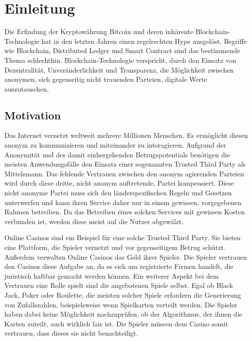 \chapter{Einleitung} %
\label{Chapter1}
\newcommand{\keyword}[1]{\textbf{#1}}
\newcommand{\tabhead}[1]{\textbf{#1}}
\newcommand{\code}[1]{\texttt{#1}}
\newcommand{\file}[1]{\texttt{\bfseries#1}}
\newcommand{\option}[1]{\texttt{\itshape#1}}
Die Erfindung der Kryptowährung Bitcoin und deren inhärente Blockchain-Technologie hat in den letzten Jahren einen regelrechten Hype ausgelöst. Begriffe wie Blockchain, Distributed Ledger und Smart Contract sind das bestimmende Thema schlechthin. 
Blockchain-Technologie verspricht, durch den Einsatz von Dezentralität, Unveränderlichkeit und Transparenz, die Möglichkeit zwischen anonymen, sich gegenseitig nicht trauenden Parteien, digitale Werte auszutauschen.

\section{Motivation}
Das Internet vernetzt weltweit mehrere Millionen Menschen. Es ermöglicht diesen anonym zu kommunizieren und miteinander zu interagieren. Aufgrund der Anonymität und des damit einhergehenden Betrugspotentials benötigen die meisten Anwendungsfälle den Einsatz einer sogenannten Trusted Third Party als Mittelsmann. Das fehlende Vertrauen zwischen den anonym agierenden Parteien wird durch diese dritte, nicht anonym auftretende, Partei kompensiert. Diese nicht anonyme Partei muss sich den länderspezifischen Regeln und Gesetzen unterwerfen und kann ihren Service daher nur in einem gewissen, vorgegebenen Rahmen betreiben. Da das Betreiben eines solchen Services mit gewissen Kosten verbunden ist, werden diese meist auf die Nutzer abgewälzt. 

Online Casinos sind ein Beispiel für eine solche Trusted Third Party. Sie bieten eine Plattform, die Spieler vernetzt und vor gegenseitigem Betrug schützt. Außerdem verwalten Online Casinos das Geld ihrer Spieler. Die Spieler vertrauen den Casinos diese Aufgabe an, da es sich um registrierte Firmen handelt, die juristisch haftbar gemacht werden können. Ein weiterer Aspekt bei dem Vertrauen eine Rolle spielt sind die angebotenen Spiele selbst. Egal ob Black Jack, Poker oder Roulette, die meisten solcher Spiele erfordern die Generierung von Zufallszahlen, beispielsweise wenn Spielkarten verteilt werden. Die Spieler haben dabei keine Möglichkeit nachzuprüfen, ob der Algorithmus, der ihnen die Karten zuteilt, auch wirklich fair ist. Die Spieler müssen dem Casino somit vertrauen, dass dieses sie nicht benachteiligt. 

